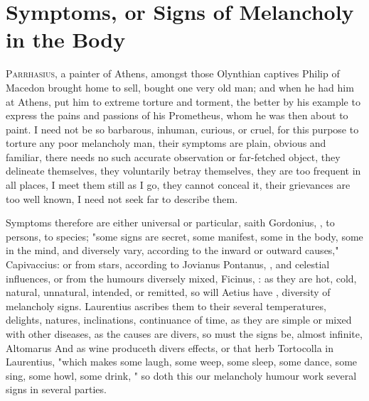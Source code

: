 \chapter[Symptoms of Melancholy]{Symptoms, or Signs of Melancholy in the Body}\label{ch:symptoms}
{
\lettrine{P}{arrhasius}, a painter of Athens, amongst those Olynthian captives
Philip of Macedon brought home to sell, bought one very old man;
and when he had him at Athens, put him to extreme torture and torment,
the better by his example to express the pains and passions of his
Prometheus, whom he was then about to paint. I need not be so
barbarous, inhuman, curious, or cruel, for this purpose to torture any
poor melancholy man, their symptoms are plain, obvious and familiar,
there needs no such accurate observation or far-fetched object, they
delineate themselves, they voluntarily betray themselves, they are too
frequent in all places, I meet them still as I go, they cannot conceal
it, their grievances are too well known, I need not seek far to
describe them.

Symptoms therefore are either universal or particular,
saith Gordonius, , to persons,
to species; "some signs are secret, some manifest, some in the body, some in
the mind, and diversely vary, according to the inward or outward causes,"
Capivaccius: or from stars, according to Jovianus Pontanus,
, and celestial
influences, or from the humours diversely mixed, Ficinus,
: as they are hot, cold,
natural, unnatural, intended, or remitted, so will Aetius have , diversity of melancholy signs. Laurentius ascribes them
to their several temperatures, delights, natures, inclinations, continuance of
time, as they are simple or mixed with other diseases, as the causes are
divers, so must the signs be, almost infinite, Altomarus
 And as wine produceth divers effects,
or that herb Tortocolla in Laurentius, "which makes some
laugh, some weep, some sleep, some dance, some sing, some howl, some drink,
\etc{}" so doth this our melancholy humour work several signs in several
parties.

}
